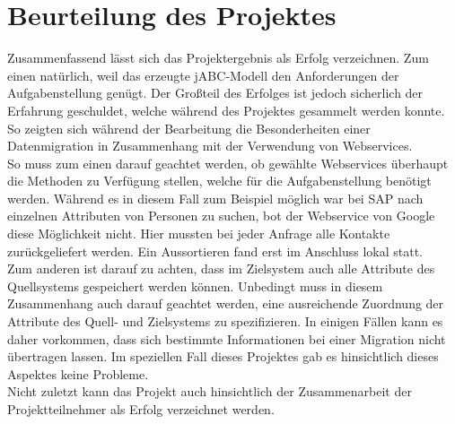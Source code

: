 \section{Beurteilung des Projektes}
\label{sec:beurteilung}

Zusammenfassend lässt sich das Projektergebnis als Erfolg verzeichnen. Zum einen natürlich, weil das erzeugte jABC-Modell den Anforderungen der Aufgabenstellung genügt. Der Großteil des Erfolges ist jedoch sicherlich der Erfahrung geschuldet, welche während des Projektes gesammelt werden konnte. So zeigten sich während der Bearbeitung die Besonderheiten einer Datenmigration in Zusammenhang mit der Verwendung von Webservices. \\
So muss zum einen darauf geachtet werden, ob gewählte Webservices überhaupt die Methoden zu Verfügung stellen, welche für die Aufgabenstellung benötigt werden. Während es in diesem Fall zum Beispiel möglich war bei SAP nach einzelnen Attributen von Personen zu suchen, bot der Webservice von Google diese Möglichkeit nicht. Hier mussten bei jeder Anfrage alle Kontakte zurückgeliefert werden. Ein Aussortieren fand erst im Anschluss lokal statt.\\
Zum anderen ist darauf zu achten, dass im Zielsystem auch alle Attribute des Quellsystems gespeichert werden können. Unbedingt muss in diesem Zusammenhang auch darauf geachtet werden, eine ausreichende Zuordnung der Attribute des Quell- und Zielsystems zu spezifizieren. In einigen Fällen kann es daher vorkommen, dass sich bestimmte Informationen bei einer Migration nicht übertragen lassen. Im speziellen Fall dieses Projektes gab es hinsichtlich dieses Aspektes keine Probleme. \\
Nicht zuletzt kann das Projekt auch hinsichtlich der Zusammenarbeit der Projektteilnehmer als Erfolg verzeichnet werden. 